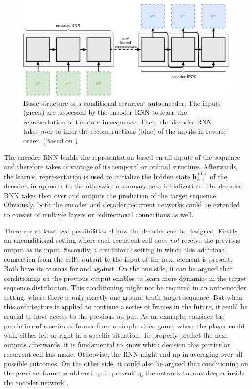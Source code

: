 \begin{figure}[htpb]
	\centering
	\includegraphics[width=.9\linewidth]{figures/rnn_autoencoder.pdf}
	\caption[Recurrent Autoencoder Model]{Basic structure of a conditional recurrent autoencoder. The inputs (green) are processed by the encoder RNN to learn the representation of the data in sequence. Then, the decoder RNN takes over to infer the reconstructions (blue) of the inputs in reverse order. (Based on \parencite{unsup_learn_lstm})} \label{fig:rnn-autoencoder}
\end{figure}

The encoder RNN builds the representation based on all inputs of the sequence and therefore takes advantage of its temporal or ordinal structure. Afterwards, the learned representation is used to initialize the hidden state $ \textbf{h}_{\textrm{dec}}^{(0)} $ of the decoder, in opposite to the otherwise customary zero initialization. The decoder RNN takes then over and outputs the prediction of the target sequence. Obviously, both the encoder and decoder recurrent networks could be extended to consist of multiple layers or bidirectional connections as well.

There are at least two possibilities of how the decoder can be designed. Firstly, an unconditional setting where each recurrent cell does \textit{not} receive the previous output as its input. Secondly, a conditional setting in which this additional connection from the cell's output to the input of the next element is present. Both have its reasons for and against. On the one side, it can be argued that conditioning on the previous output enables to learn more dynamics in the target sequence distribution. This conditioning might not be required in an autoencoder setting, where there is only exactly one ground truth target sequence. But when this architecture is applied to continue a series of frames in the future, it could be crucial to have access to the previous output. As an example, consider the prediction of a series of frames from a simple video game, where the player could walk either left or right in a specific situation. To properly predict the next outputs afterwards, it is fundamental to know which decision this particular recurrent cell has made. Otherwise, the RNN might end up in averaging over all possible outcomes. On the other side, it could also be argued that conditioning on the previous frame would end up in preventing the network to look deeper inside the encoder network \parencite{unsup_learn_lstm}.


